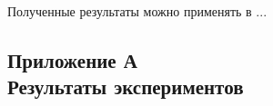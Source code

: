 \documentclass[a4paper,14pt]{article}
\begin{document}
    Полученные результаты можно применять в ...

    \newpage
    \renewcommand{\refname}{{\normalsize \hfill Список использованных источников \hfill}}
%    
    
    
    \newpage

    \begin{landscape}

        \begin{flushright}
            \section*{\normalsize \hfill Приложение А \\ \hfill Результаты экспериментов}
        \end{flushright}


\end{landscape}
\end{document}
